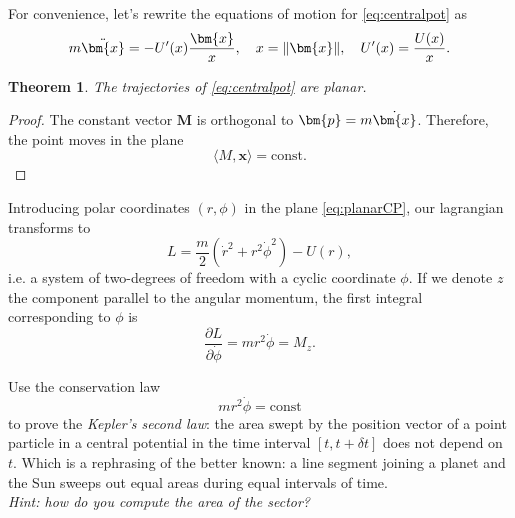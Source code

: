 \documentclass[english,fontsize=11pt,paper=a5,oneside]{scrbook}
\newcommand{\bx}{\bm{x}}
\newcommand{\bp}{\bm{p}}
\newcommand{\lag}{\langle}
\newcommand{\rag}{\rangle}
\let\d\relax
\DeclareMathOperator{\d}{d}
\newtheorem{theorem}{Theorem}[chapter]
\theoremstyle{definition}
\newenvironment{exercise}
  {\pushQED{\qed}\renewcommand{\qedsymbol}{$\maltese$}\exercisex}
  {\popQED\endexercisex}
\begin{document}
For convenience, let's rewrite the equations of motion for \eqref{eq:centralpot} as
\begin{equation}
    m\ddot \bx = - U'(x)\frac{\bx}{x}, \quad x = \|\bx\|, \quad U'(x)=\frac{\d U(x)}{\d x}.
\end{equation}

\begin{theorem}
    The trajectories of \eqref{eq:centralpot} are planar.
\end{theorem}
\begin{proof}
    The constant vector $\bm{M}$ is orthogonal to $\bp = m \dot \bx$.
    Therefore, the point moves in the plane 
    \begin{equation}\label{eq:planarCP}
        \lag M, \bx\rag = \mathrm{const}.
    \end{equation}
\end{proof}

Introducing polar coordinates $(r,\phi)$ in the plane \eqref{eq:planarCP}, our lagrangian transforms to
\begin{equation}
    L = \frac{m}{2} \left(\dot r^2 + r^2 \dot \phi^2\right) - U(r),
\end{equation}
i.e. a system of two-degrees of freedom with a cyclic coordinate $\phi$.
If we denote $z$ the component parallel to the angular momentum, the first integral corresponding to $\phi$ is
\begin{equation}\label{eq:cyclicphi}
    \frac{\partial L}{\partial \dot \phi} = m r^2 \dot \phi = M_z.
\end{equation}

\begin{exercise}
    Use the conservation law
    \begin{equation}
        m r^2 \dot \phi = \mathrm{const}
    \end{equation}
    to prove the \emph{Kepler's second law}: the area swept by the position vector of a point particle in a central potential in the time interval $[t, t+\delta t]$ does not depend on $t$. Which is a rephrasing of the better known: a line segment joining a planet and the Sun sweeps out equal areas during equal intervals of time.\\
    \textit{Hint: how do you compute the area of the sector?}
\end{exercise}
\end{document}
